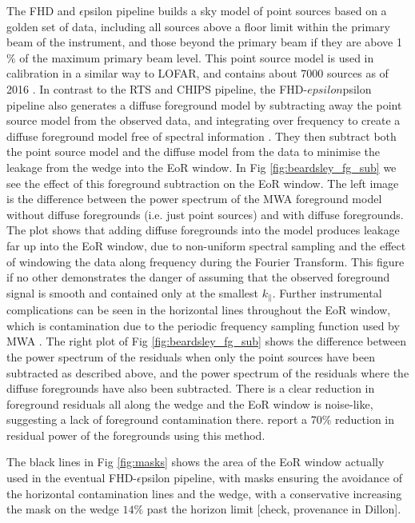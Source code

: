 The FHD \citep{Sullivan2012ApJ...759...17S} and $\epsilon$psilon \citep{Barry2019arXiv190102980B} pipeline builds a sky model of point sources based on a golden set of data, including all sources above a floor limit within the primary beam of the instrument, and those beyond the primary beam if they are above 1$\%$ of the maximum primary beam level. This point source model is used in calibration in a similar way to LOFAR, and contains about 7000 sources as of 2016 \citep{Beardsley2016ApJ...833..102B}. In contrast to the RTS \citep{Mitchell2008ISTSP...2..707M} and CHIPS \citep{Trott2016ApJ...818..139T} pipeline, the FHD-$epsilon$psilon pipeline also generates a diffuse foreground model by subtracting away the point source model from the observed data, and integrating over frequency to create a diffuse foreground model free of spectral information \citep{Beardsley2016ApJ...833..102B}. They then subtract both the point source model and the diffuse model from the data to minimise the leakage from the wedge into the EoR window. In Fig \ref{fig:beardsley_fg_sub} we see the effect of this foreground subtraction on the EoR window. The left image is the difference between the power spectrum of the MWA foreground model without diffuse foregrounds (i.e. just point sources) and with diffuse foregrounds. The plot shows that adding diffuse foregrounds into the model produces leakage far up into the EoR window, due to non-uniform spectral sampling and the effect of windowing the data along frequency during the Fourier Transform. This figure if no other demonstrates the danger of assuming that the observed foreground signal is smooth and contained only at the smallest $k_\parallel$. Further instrumental complications can be seen in the horizontal lines throughout the EoR window, which is contamination due to the periodic frequency sampling function used by MWA \citep{Offringa2016MNRAS.458.1057O}. The right plot of Fig \ref{fig:beardsley_fg_sub} shows the difference between the power spectrum of the residuals when only the point sources have been subtracted as described above, and the power spectrum of the residuals where the diffuse foregrounds have also been subtracted. There is a clear reduction in foreground residuals all along the wedge and the EoR window is noise-like, suggesting a lack of foreground contamination there. \citet{Beardsley2016ApJ...833..102B} report a 70$\%$ reduction in residual power of the foregrounds using this method.

The black lines in Fig \ref{fig:masks} shows the area of the EoR window actually used in the eventual FHD-$\epsilon$psilon pipeline, with masks ensuring the avoidance of the horizontal contamination lines and the wedge, with a conservative increasing the mask on the wedge $14\%$ past the horizon limit [check, provenance in Dillon].

